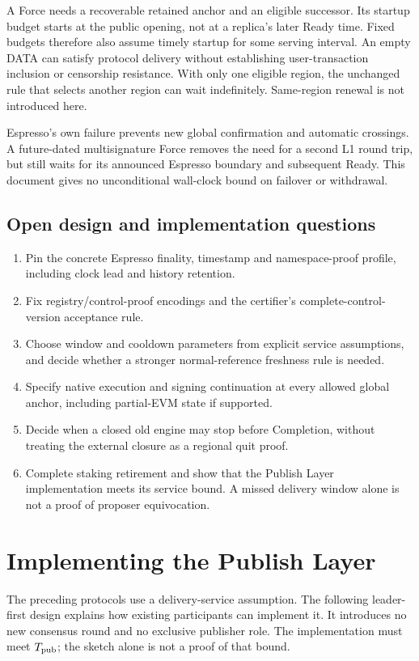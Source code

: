 \documentclass[11pt,a4paper]{article}
\newcounter{protocol}
\begin{document}
A Force needs a recoverable retained anchor and an eligible successor.
Its startup budget starts at the public opening, not at a replica's
later Ready time. Fixed budgets therefore also assume timely startup
for some serving interval. An empty DATA can satisfy protocol delivery
without establishing user-transaction inclusion or censorship resistance.
With only one eligible region, the unchanged rule that selects another
region can wait indefinitely. Same-region renewal is not introduced here.

Espresso's own failure prevents new global confirmation and automatic
crossings. A future-dated multisignature Force removes the need for a
second L1 round trip, but still waits for its announced Espresso
boundary and subsequent Ready. This document gives no unconditional
wall-clock bound on failover or withdrawal.

\subsection{Open design and implementation questions}
\begin{enumerate}[label=(\arabic*)]
\item Pin the concrete Espresso finality, timestamp and namespace-proof
profile, including clock lead and history retention.
\item Fix registry/control-proof encodings and the certifier's
complete-control-version acceptance rule.
\item Choose window and cooldown parameters from explicit service
assumptions, and decide whether a stronger normal-reference freshness
rule is needed.
\item Specify native execution and signing continuation at every
allowed global anchor, including partial-EVM state if supported.
\item Decide when a closed old engine may stop before Completion,
without treating the external closure as a regional quit proof.
\item Complete staking retirement and show that the Publish Layer
implementation meets its service bound. A missed delivery window alone
is not a proof of proposer equivocation.
\end{enumerate}

\section{Implementing the Publish Layer}
\label{sec:publish-implementation}
The preceding protocols use a delivery-service assumption. The following
leader-first design explains how existing participants can implement it.
It introduces no new consensus round and no exclusive publisher role.
The implementation must meet $T_{\rm pub}$; the sketch alone is not a
proof of that bound.
\end{document}
